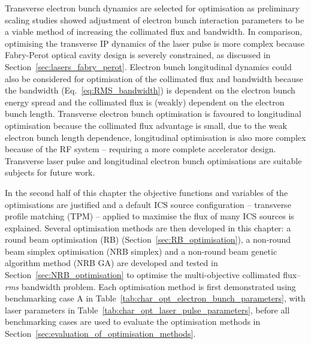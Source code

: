 \documentclass[../main.tex]{subfiles}
\begin{document}
Transverse electron bunch dynamics are selected for optimisation as preliminary scaling studies showed adjustment of electron bunch interaction parameters to be a viable method of increasing the collimated flux and bandwidth. In comparison, optimising the transverse IP dynamics of the laser pulse is more complex because Fabry-Perot optical cavity design is severely constrained, as discussed in Section~\ref{sec:lasers_fabry_perot}. Electron bunch longitudinal dynamics could also be considered for optimisation of the collimated flux and bandwidth because the bandwidth (Eq.~\ref{eq:RMS_bandwidth}) is dependent on the electron bunch energy spread and the collimated flux is (weakly) dependent on the electron bunch length. Transverse electron bunch optimisation is favoured to longitudinal optimisation because the collimated flux advantage is small, due to the weak electron bunch length dependence, longitudinal optimisation is also more complex because of the RF system -- requiring a more complete accelerator design. Transverse laser pulse and longitudinal electron bunch optimisations are suitable subjects for future work.  

In the second half of this chapter the objective functions and variables of the optimisations are justified and a default ICS source configuration -- transverse profile matching (TPM) -- applied to maximise the flux of many ICS sources is explained. Several optimisation methods are then developed in this chapter: a round beam optimisation (RB) (Section~\ref{sec:RB_optimisation}), a non-round beam simplex optimisation (NRB simplex) and a non-round beam genetic algorithm method (NRB GA) are developed and tested in Section~\ref{sec:NRB_optimisation} to optimise the multi-objective collimated flux--\textit{rms} bandwidth problem. Each optimisation method is first demonstrated using benchmarking case A in Table~\ref{tab:char_opt_electron_bunch_parameters}, with laser parameters in Table~\ref{tab:char_opt_laser_pulse_parameters}, before all benchmarking cases are used to evaluate the optimisation methods in Section~\ref{sec:evaluation_of_optimisation_methods}.
\end{document}
